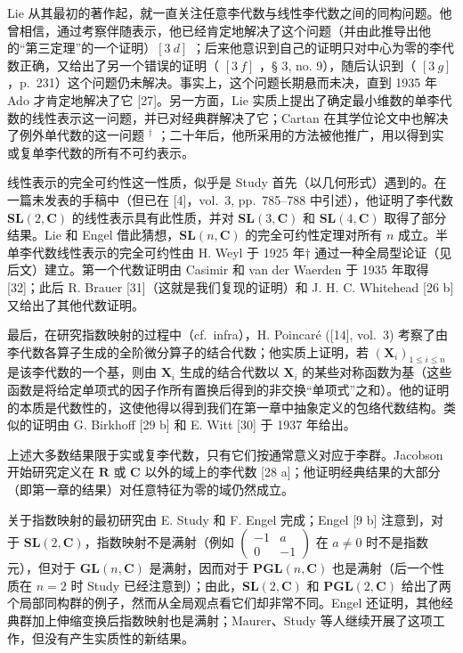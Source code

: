 Lie 从其最初的著作起，就一直关注任意李代数与线性李代数之间的同构问题。他曾相信，通过考察伴随表示，他已经肯定地解决了这个问题（并由此推导出他的“第三定理”的一个证明）\([3\ d]\) ；后来他意识到自己的证明只对中心为零的李代数正确，又给出了另一个错误的证明（ \([3\ f]\) ，§ 3, no. 9），随后认识到（ \([3\ g]\) ，p.~231）这个问题仍未解决。事实上，这个问题长期悬而未决，直到 1935 年 Ado 才肯定地解决了它 {[}27{]}。另一方面，Lie 实质上提出了确定最小维数的单李代数的线性表示这一问题，并已对经典群解决了它；Cartan 在其学位论文中也解决了例外单代数的这一问题 \(^{\dagger}\) ；二十年后，他所采用的方法被他推广，用以得到实或复单李代数的所有不可约表示。

线性表示的完全可约性这一性质，似乎是 Study 首先（以几何形式）遇到的。在一篇未发表的手稿中（但已在 {[}4{]}，vol.~3, pp.~785--788 中引述），他证明了李代数 \(\mathbf{SL}(2,\mathbf{C})\) 的线性表示具有此性质，并对 \(\mathbf{SL}(3,\mathbf{C})\) 和 \(\mathbf{SL}(4,\mathbf{C})\) 取得了部分结果。Lie 和 Engel 借此猜想，\(\mathbf{SL}(n,\mathbf{C})\) 的完全可约性定理对所有 \(n\) 成立。半单李代数线性表示的完全可约性由 H. Weyl 于 1925 年† 通过一种全局型论证（见后文）建立。第一个代数证明由 Casimir 和 van der Waerden 于 1935 年取得 {[}32{]}；此后 R. Brauer {[}31{]}（这就是我们复现的证明）和 J. H. C. Whitehead {[}26 b{]} 又给出了其他代数证明。

最后，在研究指数映射的过程中（cf.~infra），H. Poincaré ({[}14{]}, vol.~3) 考察了由李代数各算子生成的全阶微分算子的结合代数；他实质上证明，若 \((\mathbf{X}_i)_{1\leqslant i\leqslant n}\) 是该李代数的一个基，则由 \(\mathbf{X}_i\) 生成的结合代数以 \(\mathbf{X}_i\) 的某些对称函数为基（这些函数是将给定单项式的因子作所有置换后得到的非交换“单项式”之和）。他的证明的本质是代数性的，这使他得以得到我们在第一章中抽象定义的包络代数结构。类似的证明由 G. Birkhoff {[}29 b{]} 和 E. Witt {[}30{]} 于 1937 年给出。

上述大多数结果限于实或复李代数，只有它们按通常意义对应于李群。Jacobson 开始研究定义在 \(\mathbf{R}\) 或 \(\mathbf{C}\) 以外的域上的李代数 {[}28 a{]}；他证明经典结果的大部分（即第一章的结果）对任意特征为零的域仍然成立。


关于指数映射的最初研究由 E. Study 和 F. Engel 完成；Engel {[}9 b{]} 注意到，对于 \(\mathbf{SL}(2, \mathbf{C})\)，指数映射不是满射（例如 \(\begin{pmatrix} -1 & a \\ 0 & -1 \end{pmatrix}\) 在 \(a \neq 0\) 时不是指数元），但对于 \(\mathbf{GL}(n, \mathbf{C})\) 是满射，因而对于 \(\mathbf{PGL}(n, \mathbf{C})\) 也是满射（后一个性质在 \(n = 2\) 时 Study 已经注意到）；由此，\(\mathbf{SL}(2, \mathbf{C})\) 和 \(\mathbf{PGL}(2, \mathbf{C})\) 给出了两个局部同构群的例子，然而从全局观点看它们却非常不同。Engel 还证明，其他经典群加上伸缩变换后指数映射也是满射；Maurer、Study 等人继续开展了这项工作，但没有产生实质性的新结果。

